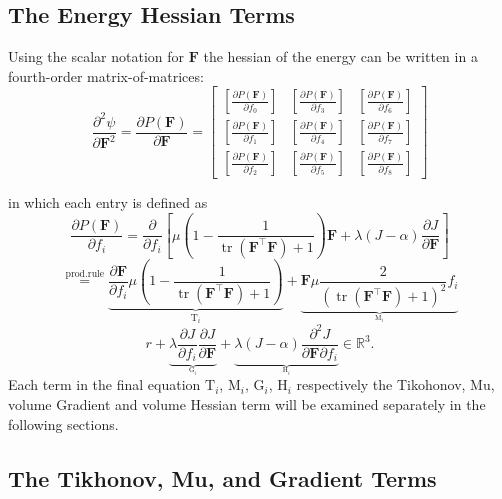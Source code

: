 
\subsection{The Energy Hessian Terms}
Using the scalar notation for $\mathbf{F}$ the hessian of the energy can be written in a fourth-order matrix-of-matrices:
\[
\frac{\partial^2 \psi}{\partial \mathbf{F}^2} = \frac{\partial P(\mathbf{F})}{\partial \mathbf{F}} = 
\left[\begin{array}{ccc}{\left[\frac{\partial P(\mathbf{F})}{\partial f_0}\right]} & {\left[\frac{\partial P(\mathbf{F})}{\partial f_3}\right]} & {\left[\frac{\partial P(\mathbf{F})}{\partial f_6}\right]} \\ {\left[\frac{\partial P(\mathbf{F})}{\partial f_1}\right]} & {\left[\frac{\partial P(\mathbf{F})}{\partial f_4}\right]} & {\left[\frac{\partial P(\mathbf{F})}{\partial f_7}\right]} \\ {\left[\frac{\partial P(\mathbf{F})}{\partial f_2}\right]} & {\left[\frac{\partial P(\mathbf{F})}{\partial f_5}\right]} & {\left[\frac{\partial P(\mathbf{F})}{\partial f_8}\right]} \end{array}\right]
\]

in which each entry is defined as
\[
\frac{\partial P(\mathbf{F})}{\partial f_i} = \frac{\partial}{\partial f_i} \left[ \mu \left( 1 - \frac{1}{\operatorname{tr}(\mathbf{F}^\intercal \mathbf{F}) + 1}\right) \mathbf{F} + \lambda(J-\alpha)\frac{\partial J}{\partial \mathbf{F}} \right]
\]
\[
\stackrel{\text{prod.rule}}{=} \underbrace{\frac{\partial \mathbf{F}}{\partial f_i} \mu \left( 1 - \frac{1}{\operatorname{tr}(\mathbf{F}^\intercal \mathbf{F}) + 1}\right)}_{\mathrm{T}_{i}}  + \underbrace{\mathbf{F} \mu \frac{2}{\left(\operatorname{tr}(\mathbf{F^\intercal}\mathbf{F}) + 1\right)^2} f_i}_{_{\mathrm{M}_{i}}}
\]
\[
r+ \underbrace{\lambda \frac{\partial J}{\partial f_i} \frac{\partial J}{\partial \mathbf{F}}}_{_{\mathrm{G}_{i}}}+ \underbrace{\lambda (J- \alpha) \frac{\partial^2 J}{\partial \mathbf{F}\partial f_i}}_{_{\mathrm{H}_{i}}} \in \mathbb{R}^{3}.
\]
Each term in the final equation $\mathrm{T}_i$, $\mathrm{M}_i$, $\mathrm{G}_i$, $\mathrm{H}_i$ respectively the Tikohonov, Mu, volume Gradient and volume Hessian term will be examined separately in the following sections.

\subsection{The Tikhonov, Mu, and Gradient Terms}
